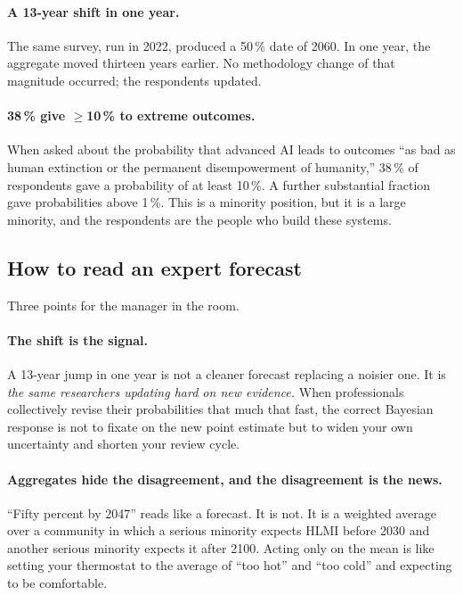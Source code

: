 \documentclass[11pt,a4paper]{article}
\begin{document}
\paragraph{A 13-year shift in one year.} The same survey, run in 2022,
produced a 50\,\% date of 2060. In one year, the aggregate moved
thirteen years earlier. No methodology change of that magnitude
occurred; the respondents updated.

\paragraph{38\,\% give $\geq$10\,\% to extreme outcomes.} When asked
about the probability that advanced AI leads to outcomes ``as bad as
human extinction or the permanent disempowerment of humanity,'' 38\,\%
of respondents gave a probability of at least 10\,\%. A further
substantial fraction gave probabilities above 1\,\%. This is a
minority position, but it is a large minority, and the respondents are
the people who build these systems.

\subsection{How to read an expert forecast}

Three points for the manager in the room.

\paragraph{The shift is the signal.} A 13-year jump in one year is not
a cleaner forecast replacing a noisier one. It is \emph{the same
researchers updating hard on new evidence.} When professionals
collectively revise their probabilities that much that fast, the
correct Bayesian response is not to fixate on the new point estimate
but to widen your own uncertainty and shorten your review cycle.

\paragraph{Aggregates hide the disagreement, and the disagreement is
the news.} ``Fifty percent by 2047'' reads like a forecast. It is not.
It is a weighted average over a community in which a serious minority
expects HLMI before 2030 and another serious minority expects it after
2100. Acting only on the mean is like setting your thermostat to the
average of ``too hot'' and ``too cold'' and expecting to be
comfortable.
\end{document}
